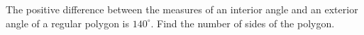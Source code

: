 The positive difference between the measures of an interior angle and an exterior angle of a regular polygon is $140^\circ$. Find the number of sides of the polygon.
